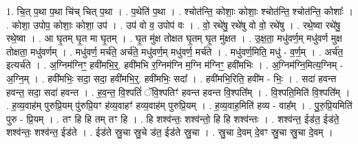\documentclass[17pt]{extarticle}
\begin{document}
1. चि॒त् प॒था प॒था चि॑च् चित् प॒था । . प॒थेति॑ प॒था । . श्चोत॑न्ति॒ कोशाः॒ कोशाः॒ श्चोत॑न्ति॒ श्चोत॑न्ति॒ कोशाः᳚ । . कोशा॒ उपोप॒ कोशाः॒ कोशा॒ उप॑ । . उप॑ वो व॒ उपोप॑ वः । . वो॒ रथे॑षु॒ रथे॑षु वो वो॒ रथे॑षु । . रथे॒ष्वा रथे॑षु॒ रथे॒ष्वा । . आ घृ॒तम् घृ॒त मा घृ॒तम् । . घृ॒त मु॑क्ष तोक्षत घृ॒तम् घृ॒त मु॑क्षत । . उ॒क्ष॒ता॒ मधु॑वर्ण॒म् मधु॑वर्ण मुक्ष तोक्षता॒ मधु॑वर्णम् । . मधु॑वर्ण॒ मर्च॑ते॒ अर्च॑ते॒ मधु॑वर्ण॒म् मधु॑वर्ण॒ मर्च॑ते । . मधु॑वर्ण॒मिति॒ मधु॑ - व॒र्ण॒म् । . अर्च॑त॒ इत्यर्च॑ते । . अ॒ग्निम॑ग्निꣳ॒॒ हवी॑मभि॒र्॒. हवी॑मभि र॒ग्निम॑ग्नि म॒ग्नि म॑ग्निꣳ॒॒ हवी॑मभिः । . अ॒ग्निम॑ग्नि॒मित्य॒ग्निम् - अ॒ग्नि॒म् । . हवी॑मभिः॒ सदा॒ सदा॒ हवी॑मभि॒र्॒. हवी॑मभिः॒ सदा᳚ । . हवी॑मभि॒रिति॒ हवी॑म - भिः॒ । . सदा॑ हवन्त हवन्त॒ सदा॒ सदा॑ हवन्त । . ह॒व॒न्त॒ वि॒श्पतिं॑ ॅवि॒श्पतिꣳ॑ हवन्त हवन्त वि॒श्पति᳚म् । . वि॒श्पति॒मिति॑ वि॒श्पति᳚म् । . ह॒व्य॒वाह॑म् पुरुप्रि॒यम् पु॑रुप्रि॒यꣳ ह॑व्य॒वाहꣳ॑ हव्य॒वाह॑म् पुरुप्रि॒यम् । . ह॒व्य॒वाह॒मिति॑ हव्य - वाह᳚म् । . पु॒रु॒प्रि॒यमिति॑ पुरु - प्रि॒यम् । . तꣳ हि हि तम् तꣳ हि । . हि शश्व॑न्तः॒ शश्व॑न्तो॒ हि हि शश्व॑न्तः । . शश्व॑न्त॒ ईड॑त॒ ईड॑ते॒ शश्व॑न्तः॒ शश्व॑न्त॒ ईड॑ते । . ईड॑ते स्रु॒चा स्रु॒चे ड॑त॒ ईड॑ते स्रु॒चा । . स्रु॒चा दे॒वम् दे॒वꣳ स्रु॒चा स्रु॒चा दे॒वम् । \newline
\end{document}

